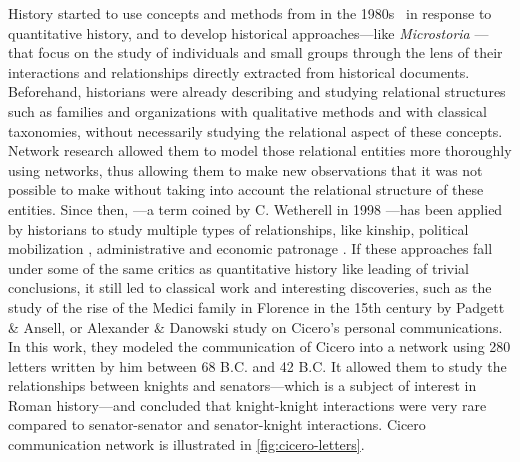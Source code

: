 History started to use concepts and methods from \sna in the 1980s~\cite{wetherellHistoricalSocialNetwork1998} in response to quantitative history,
and to develop historical approaches---like \textit{Microstoria} \cite{ginzburgMicrohistoire1981}---that focus on the study of individuals and small groups through the lens of their interactions and relationships directly extracted from historical documents.
Beforehand, historians were already describing and studying relational structures such as families and organizations with qualitative methods and with classical taxonomies, without necessarily studying the relational aspect of these concepts.
Network research allowed them to model those relational entities more thoroughly using networks, thus allowing them to make new observations that it was not possible to make without taking into account the relational structure of these entities\cite{cristofoliAuxSourcesGrands2008}.
Since then, \hsna---a term coined by C. Wetherell in 1998 \cite{wetherellHistoricalSocialNetwork1998}---has been applied by historians to study multiple types of relationships, like kinship\cite{hambergerScanningPatternsRelationship2014},  political mobilization \cite{lippKinshipNetworksLocal2005}, administrative and economic patronage \cite{moutoukias1992}.
If these approaches fall under some of the same critics as quantitative history \cite{lemercier12FormalNetwork2015} like leading of trivial conclusions, it still led to classical work and interesting discoveries, such as the study of the rise of the Medici family in Florence in the 15th century by Padgett \& Ansell\cite{padgettRobustActionRise1993}, or Alexander \& Danowski study on Cicero's personal communications\cite{alexanderAnalysisAncientNetwork1990}.
In this work, they modeled the communication of Cicero into a network using 280 letters written by him between 68 B.C. and 42 B.C.
It allowed them to study the relationships between knights and senators---which is a subject of interest in Roman history---and concluded that knight-knight interactions were very rare compared to senator-senator and senator-knight interactions.
Cicero communication network is illustrated in \autoref{fig:cicero-letters}.


